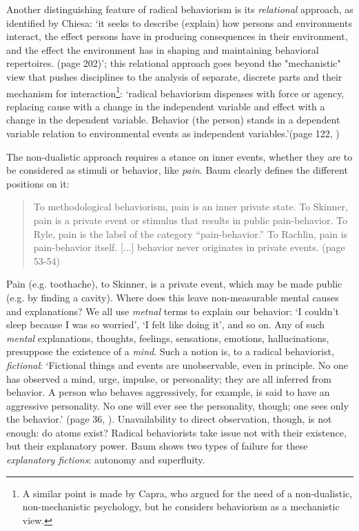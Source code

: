 \documentclass[letterpaper,11pt,twocolumn]{article}
\begin{document}
Another distinguishing feature of radical behaviorism is its \textit{relational} approach, as identified by Chiesa: \enquote*{it seeks to describe (explain) how persons and environments interact, the effect persons have in producing consequences in their environment, and the effect the environment has in shaping and maintaining behavioral repertoires. (page 202)}\cite{chiesaRadicalBehaviorismPhilosophy1994}; this relational approach goes beyond the "mechanistic" view that pushes disciplines to the analysis of separate, discrete parts and their mechanism for interaction\footnote{A similar point is made by Capra\cite{capraTurningPointScience1983}, who argued for the need of a non-dualistic, non-mechanistic psychology, but he considers behaviorism as a mechanistic view.}: \enquote*{radical behaviorism dispenses with force or agency, replacing cause with a change in the independent variable and effect with a change in the dependent variable. Behavior (the person) stands in a dependent variable relation to environmental events as independent variables.}(page 122, \cite{chiesaRadicalBehaviorismPhilosophy1994})

The non-dualistic approach requires a stance on inner events, whether they are to be considered as stimuli or behavior, like \textit{pain}. Baum \cite{baumUnderstandingBehaviorismBehavior2017} clearly defines the different positions on it:
\begin{quote}
    To methodological behaviorism, pain is an inner private state. To Skinner, pain is a private event or stimulus that results in public pain-behavior. To Ryle, pain is the label of the category “pain-behavior.” To Rachlin, pain is pain-behavior itself. [...]  behavior never originates in private events. (page 53-54)
\end{quote}

Pain (e.g. toothache), to Skinner, is a private event, which may be made public (e.g. by finding a cavity). Where does this leave non-measurable mental causes and explanations? We all use \textit{metnal} terms to explain our behavior: \enquote*{I couldn't sleep because I was so worried}, \enquote*{I felt like doing it}, and so on. Any of such \textit{mental} explanations, thoughts, feelings, sensations, emotions, hallucinations, presuppose the existence of a \textit{mind}. Such a notion is, to a radical behaviorist, \textit{fictional}: \enquote*{Fictional things and events are unobservable, even in principle. No one has observed a mind, urge, impulse, or personality; they are all inferred from behavior. A person who behaves aggressively, for example, is said to have an aggressive personality. No one will ever see the personality, though; one sees only the behavior.} (page 36, \cite{baumUnderstandingBehaviorismBehavior2017}). Unavailability to direct observation, though, is not enough: do atoms exist? Radical behaviorists take issue not with their existence, but their explanatory power. Baum shows two types of failure for these \textit{explanatory fictions}: autonomy and superfluity.
\end{document}
